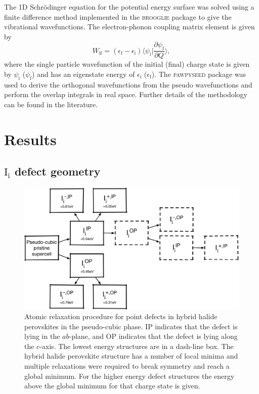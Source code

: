 The 1D Schr\"{o}dinger equation for the potential energy surface was solved using a finite difference method implemented in the \textsc{brooglie} package\autocite{brooglie} to give the vibrational wavefunctions. 
The electron-phonon coupling matrix element is given by
\begin{equation} \label{epcouplingterm}
    W_\textrm{if} = (\epsilon_\textrm{f}-\epsilon_\textrm{i})\langle\psi_\textrm{i}|\frac{\partial\psi_\textrm{f}}{\partial Q}\rangle,
\end{equation}
where the single particle wavefunction of the initial (final) charge state is given by $\psi_\textrm{i}$ ($\psi_\textrm{f}$) and has an eigenstate energy of $\epsilon_\textrm{i}$ ($\epsilon_\textrm{f}$). The \textsc{pawpyseed} package\autocite{pawpyseed} was used to derive the orthogonal wavefunctions from the  pseudo wavefunctions and perform the overlap integrals in real space.
Further details of  the  methodology  can  be  found  in  the  literature.\autocite{Alkauskas2014} 

\section{Results} \label{ch:6-results}

\subsection{$\textrm{I}_\textrm{i}$ defect geometry}

\begin{figure}[h!]
\centering
  \includegraphics[width=0.7\columnwidth]{figures/ch6/relaxation_workflow.png}
  \caption[Atomic relaxation procedure for point defects in hybrid halide perovskites]{Atomic relaxation procedure for point defects in hybrid halide perovskites in the pseudo-cubic phase. IP indicates that the defect is lying in the $ab$-plane, and OP indicates that the defect is lying along the $c$-axis. The lowest energy structures are in a dash-line box. The hybrid halide perovskite structure has a number of local minima and multiple relaxations were required to break symmetry and reach a global minimum. For the higher energy defect structures the energy above the global minimum for that charge state is given.}
\label{relaxation_workflow}
\end{figure}

